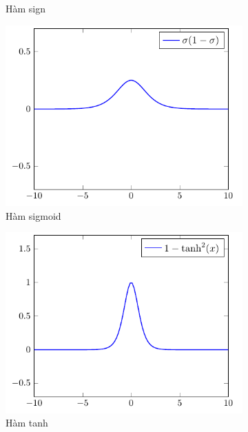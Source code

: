 \begin{figure}[htbp]
\begin{subfigure}[b]{0.33\textwidth}
        \caption{Hàm sign}
    \end{subfigure}%
    \begin{subfigure}[b]{0.33\textwidth}
        \centering
        \includegraphics[width=\textwidth]{tikz_image/diff_sigmoid.pdf}
        \caption{Hàm sigmoid}
    \end{subfigure}\newline
    \begin{subfigure}[b]{0.33\textwidth}
        \centering
        \includegraphics[width=\textwidth]{tikz_image/diff_tanh.pdf}
        \caption{Hàm tanh}
    \end{subfigure}%
    \begin{subfigure}[b]{0.33\textwidth}

\end{subfigure}
\end{figure}
